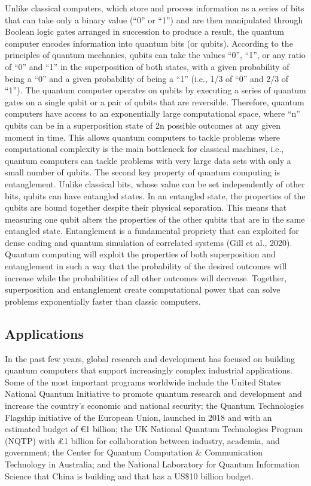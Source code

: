 \documentclass[
  letterpaper,
  DIV=11,
  numbers=noendperiod]{scrreprt}
\begin{document}
Unlike classical computers, which store and process information as a
series of bits that can take only a binary value (``0'' or ``1'') and
are then manipulated through Boolean logic gates arranged in succession
to produce a result, the quantum computer encodes information into
quantum bits (or qubits). According to the principles of quantum
mechanics, qubits can take the values ``0'', ``1'', or any ratio of
``0'' and ``1'' in the superposition of both states, with a given
probability of being a ``0'' and a given probability of being a ``1''
(i.e., 1/3 of ``0'' and 2/3 of ``1''). The quantum computer operates on
qubits by executing a series of quantum gates on a single qubit or a
pair of qubits that are reversible. Therefore, quantum computers have
access to an exponentially large computational space, where ``n'' qubits
can be in a superposition state of 2n possible outcomes at any given
moment in time. This allows quantum computers to tackle problems where
computational complexity is the main bottleneck for classical machines,
i.e., quantum computers can tackle problems with very large data sets
with only a small number of qubits. The second key property of quantum
computing is entanglement. Unlike classical bits, whose value can be set
independently of other bits, qubits can have entangled states. In an
entangled state, the properties of the qubits are bound together despite
their physical separation. This means that measuring one qubit alters
the properties of the other qubits that are in the same entangled state.
Entanglement is a fundamental propriety that can exploited for dense
coding and quantum simulation of correlated systems (Gill et al., 2020).
Quantum computing will exploit the properties of both superposition and
entanglement in such a way that the probability of the desired outcomes
will increase while the probabilities of all other outcomes will
decrease. Together, superposition and entanglement create computational
power that can solve problems exponentially faster than classic
computers.

\hypertarget{applications-3}{%
\subsection{Applications}\label{applications-3}}

In the past few years, global research and development has focused on
building quantum computers that support increasingly complex industrial
applications. Some of the most important programs worldwide include the
United States National Quantum Initiative to promote quantum research
and development and increase the country's economic and national
security; the Quantum Technologies Flagship initiative of the European
Union, launched in 2018 and with an estimated budget of €1 billion; the
UK National Quantum Technologies Program (NQTP) with ₤1 billion for
collaboration between industry, academia, and government; the Center for
Quantum Computation \& Communication Technology in Australia; and the
National Laboratory for Quantum Information Science that China is
building and that has a US\$10 billion budget.
\end{document}
